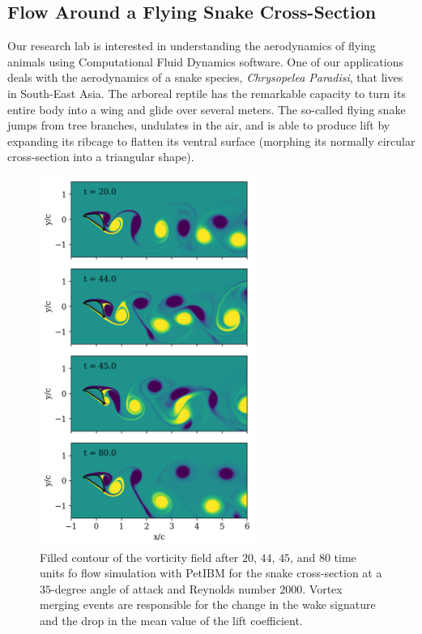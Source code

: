 \documentclass[10pt,journal,compsoc]{IEEEtran}
\begin{document}
\subsection{Flow Around a Flying Snake Cross-Section}\label{subsec:snake}

Our research lab is interested in understanding the aerodynamics of flying animals using Computational Fluid Dynamics software.
One of our applications deals with the aerodynamics of a snake species, \textit{Chrysopelea Paradisi}, that lives in South-East Asia.
The arboreal reptile has the remarkable capacity to turn its entire body into a wing and glide over several meters\cite{socha_2011}.
The so-called flying snake jumps from tree branches, undulates in the air, and is able to produce lift by expanding its ribcage to flatten its ventral surface (morphing its normally circular cross-section into a triangular shape).

\begin{figure}[!ht]
    \centering
    \includegraphics[width=7cm]{figures/wz_multi_contourf.png}
    \caption{Filled contour of the vorticity field after $20$, $44$, $45$, and $80$ time units fo flow simulation with PetIBM for the snake cross-section at a $35$-degree angle of attack and Reynolds number $2000$. Vortex merging events are responsible for the change in the wake signature and the drop in the mean value of the lift coefficient.}
    \label{fig:vorticity2d}
\end{figure}
\end{document}
